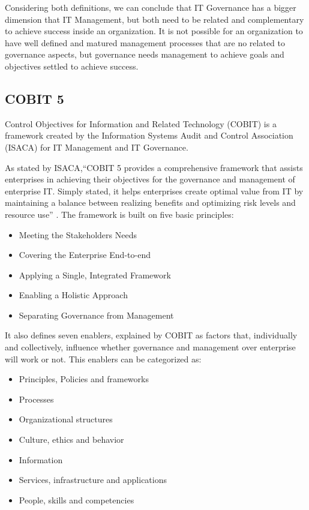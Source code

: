 Considering both definitions, we can conclude that IT Governance has a bigger dimension that IT Management, but both need to be related and complementary to achieve success inside an organization. It is not possible for an organization to have well defined and matured management processes that are no related to governance aspects, but governance needs management to achieve goals and objectives settled to achieve success.

\subsection{COBIT 5}

Control Objectives for Information and Related Technology (COBIT) is a framework created by the Information Systems Audit and Control Association (ISACA) for IT Management and IT Governance.\par
As stated by ISACA,``COBIT 5 provides a comprehensive framework that assists enterprises in achieving their objectives for the governance and management of enterprise IT. Simply stated, it helps enterprises create optimal value from IT by maintaining a balance between realizing benefits and optimizing risk levels and resource use'' \cite{2012cobit}. The framework is built on five basic principles:

\begin{itemize}
  \item Meeting the Stakeholders Needs 
  \item Covering the Enterprise End-to-end
  \item Applying a Single, Integrated Framework
  \item Enabling a Holistic Approach
  \item Separating Governance from Management
\end{itemize}


It also defines seven enablers, explained by COBIT as factors that, individually and collectively, influence whether governance and management over enterprise will work or not. This enablers can be categorized as:

\begin{itemize}
  \item Principles, Policies and frameworks 
  \item Processes 
  \item Organizational structures
  \item Culture, ethics and behavior 
  \item Information
  \item Services, infrastructure and applications
  \item People, skills and competencies
\end{itemize}

